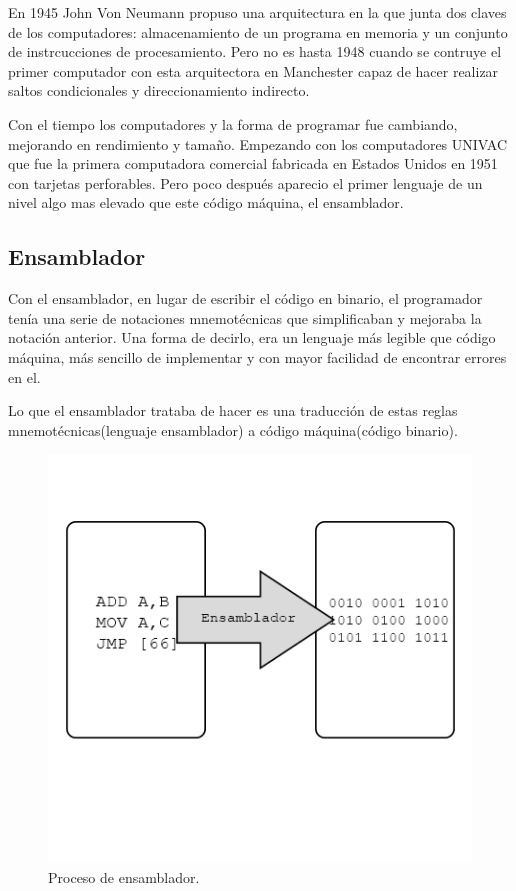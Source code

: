 \documentclass{article}
\begin{document}
    En 1945 John Von Neumann propuso una arquitectura en la que junta dos claves de los computadores: almacenamiento de un
    programa en memoria y un conjunto de instrcucciones de procesamiento. Pero no es hasta 1948 cuando se contruye el primer
    computador con esta arquitectora en Manchester capaz de hacer realizar saltos condicionales y direccionamiento indirecto.

    Con el tiempo los computadores y la forma de programar fue cambiando, mejorando en rendimiento y tamaño. Empezando con los
    computadores UNIVAC que fue la primera computadora comercial fabricada en Estados Unidos en 1951 con tarjetas
    perforables. Pero poco después aparecio el primer lenguaje de un nivel algo mas elevado que este código máquina, el
    ensamblador.

    \subsection{Ensamblador}

    Con el ensamblador, en lugar de escribir el código en binario, el programador tenía una serie de notaciones mnemotécnicas
    que simplificaban y mejoraba la notación anterior. Una forma de decirlo, era un lenguaje más legible que código máquina,
    más sencillo de implementar y con mayor facilidad de encontrar errores en el.

    Lo que el ensamblador trataba de hacer es una traducción de estas reglas mnemotécnicas(lenguaje ensamblador) a
    código máquina(código binario).
    \begin{figure}[H]
        \centering
        \includegraphics[scale = 0.6]{imagesMem/ensamblador.png}
        \caption{Proceso de ensamblador.}
    \end{figure}
\end{document}
